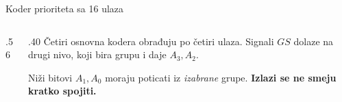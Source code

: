 \begin{frame}[label=03-s019]{Koder prioriteta sa 16 ulaza}
\begin{columns}[c,onlytextwidth]
\begin{column}{.56\textwidth}\centering

\end{column}
\begin{column}{.40\textwidth}
Četiri osnovna kodera obrađuju po četiri ulaza. Signali \(GS\) dolaze na drugi nivo, koji bira grupu i daje \(A_3,A_2\).
\par\vspace{3mm}
Niži bitovi \(A_1,A_0\) moraju poticati iz \emph{izabrane} grupe. \textcolor{DEisticanje}{\textbf{Izlazi se ne smeju kratko spojiti.}}
\par\vspace{3mm}
\end{column}
\end{columns}
\end{frame}
